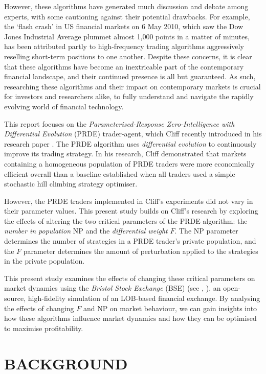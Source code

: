 \documentclass[a4paper,twoside]{article}
\begin{document}
However, these algorithms have generated much discussion and debate among experts, with some cautioning against their potential drawbacks.
For example, the `flash crash' in US financial markets on 6 May 2010, which saw the Dow Jones Industrial Average plummet almost 1,000 points in a matter of minutes, has been attributed partly to high-frequency trading algorithms aggressively reselling short-term positions to one another.
Despite these concerns, it is clear that these algorithms have become an inextricable part of the contemporary financial landscape, and their continued presence is all but guaranteed.
As such, researching these algorithms and their impact on contemporary markets is crucial for investors and researchers alike, to fully understand and navigate the rapidly evolving world of financial technology.

This report focuses on the \textit{Parameterised-Response Zero-Intelligence with Differential Evolution} (PRDE) trader-agent, which Cliff recently introduced in his research paper \cite{PRDE}.
The PRDE algorithm uses \textit{differential evolution} \cite{StornPrice} to continuously improve its trading strategy.
In his research, Cliff demonstrated that markets containing a homogeneous population of PRDE traders were more economically efficient overall than a baseline established when all traders used a simple stochastic hill climbing strategy optimiser.

However, the PRDE traders implemented in Cliff's experiments did not vary in their parameter values.
This present study builds on Cliff's research by exploring the effects of altering the two critical parameters of the PRDE algorithm: the \textit{number in population} $\mathrm{NP}$ and the \textit{differential weight} $F$.
The $\mathrm{NP}$ parameter determines the number of strategies in a PRDE trader's private population, and the $F$ parameter determines the amount of perturbation applied to the strategies in the private population.

This present study examines the effects of changing these critical parameters on market dynamics using the \textit{Bristol Stock Exchange} (BSE) (see \cite{BSE}, \cite{BSEPaper}), an open-source, high-fidelity simulation of an LOB-based financial exchange.
By analysing the effects of changing $F$ and $\mathrm{NP}$ on market behaviour, we can gain insights into how these algorithms influence market dynamics and how they can be optimised to maximise profitability.

\section{\uppercase{Background}}
\end{document}
